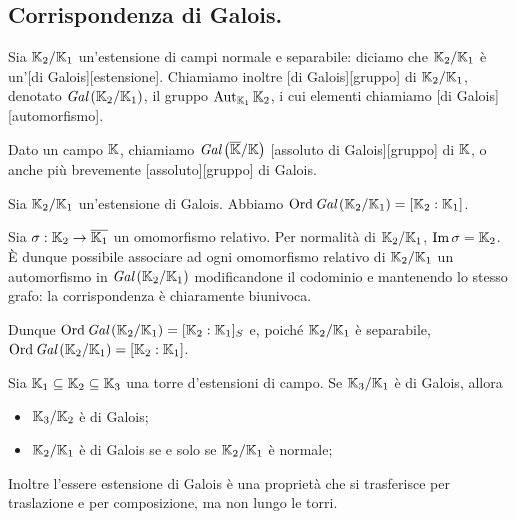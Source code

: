 \subsection{Corrispondenza di Galois.}\label{CorrispondenzaDiGalois}
\begin{Definition}
	Sia $\FieldExtension{\Field_2}{\Field_1}$ un'estensione di campi normale e separabile: diciamo che $\FieldExtension{\Field_2}{\Field_1}$ \`e un'[di Galois][estensione]. Chiamiamo inoltre [di Galois][gruppo] di $\FieldExtension{\Field_2}{\Field_1}$, denotato $\GaloisGroup{\Field_2}{\Field_1}$, il gruppo $\RelativeAutomorphisms{\Field_2}{\Field_1}$, i cui elementi chiamiamo [di Galois][automorfismo].
\end{Definition}
\begin{Definition}
	Dato un campo $\Field$, chiamiamo $\GaloisGroup{\AlgebraicClosure{\Field}}{\Field}$ [assoluto di Galois][gruppo] di $\Field$, o anche pi\`u brevemente [assoluto][gruppo] di Galois.
\end{Definition}
\begin{Theorem}
	Sia $\FieldExtension{\Field_2}{\Field_1}$ un'estensione di Galois. Abbiamo $\GroupOrder{\GaloisGroup{\Field_2}{\Field_1}} = \FieldDegree{\Field_2}{\Field_1}$.
\end{Theorem}
\Proof Sia $\RelativeHomomorphism: \Field_2 \rightarrow \AlgebraicClosure{\Field_1}$ un omomorfismo relativo. Per normalit\`a di $\FieldExtension{\Field_2}{\Field_1}$, $\Image{\RelativeHomomorphism} = \Field_2$. \`E dunque possibile associare ad ogni omomorfismo relativo di $\FieldExtension{\Field_2}{\Field_1}$ un automorfismo in $\GaloisGroup{\Field_2}{\Field_1}$ modificandone il codominio e mantenendo lo stesso grafo: la corrispondenza \`e chiaramente biunivoca.
\par Dunque $\GroupOrder{\GaloisGroup{\Field_2}{\Field_1}} = \SeparableDegree{\Field_2}{\Field_1}$ e, poich\'e $\FieldExtension{\Field_2}{\Field_1}$ \`e separabile, $\GroupOrder{\GaloisGroup{\Field_2}{\Field_1}} = \FieldDegree{\Field_2}{\Field_1}$. \EndProof
\begin{Theorem}
	Sia $\Field_1 \subseteq \Field_2 \subseteq \Field_3$ una torre d'estensioni di campo. Se $\FieldExtension{\Field_3}{\Field_1}$ \`e di Galois, allora
	\begin{itemize}
		\item $\FieldExtension{\Field_3}{\Field_2}$ \`e di Galois;
		\item $\FieldExtension{\Field_2}{\Field_1}$ \`e di Galois se e solo se $\FieldExtension{\Field_2}{\Field_1}$ \`e normale;
	\end{itemize}
	Inoltre l'essere estensione di Galois \`e una propriet\`a che si trasferisce per traslazione e per composizione, ma non lungo le torri.
\end{Theorem}
